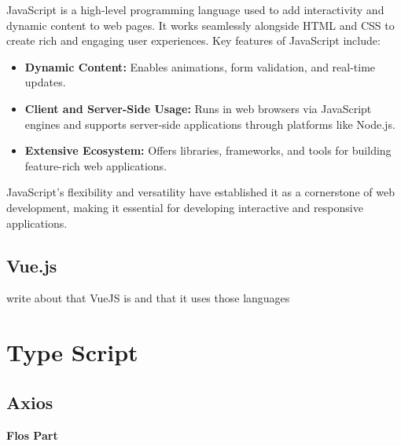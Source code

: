 JavaScript is a high-level programming language used to add interactivity and dynamic content to web pages. It works seamlessly alongside HTML and CSS to create rich and engaging user experiences. Key features of JavaScript include:

\begin{itemize}
    \item \textbf{Dynamic Content:} Enables animations, form validation, and real-time updates.
    \item \textbf{Client and Server-Side Usage:} Runs in web browsers via JavaScript engines and supports server-side applications through platforms like Node.js.
    \item \textbf{Extensive Ecosystem:} Offers libraries, frameworks, and tools for building feature-rich web applications.
\end{itemize}

JavaScript’s flexibility and versatility have established it as a cornerstone of web development, making it essential for developing interactive and responsive applications.

\cite{JavaScript-Wikipedia}

\subsection{Vue.js}

write about that VueJS is and that it uses those languages

\section{Type Script}

\subsection{Axios}

\textbf{Flos Part}

